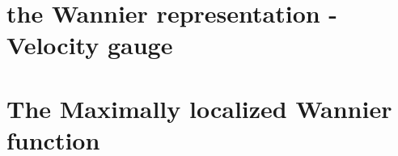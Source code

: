 \documentclass[aps,prb,preprint]{revtex4-1}
\begin{document}
\begin{appendix}
\section{the Wannier representation -Velocity gauge }\cite{Iafrate} 
\label{sec:WV}



\section{The Maximally localized Wannier function}
\end{appendix}




\end{document}
